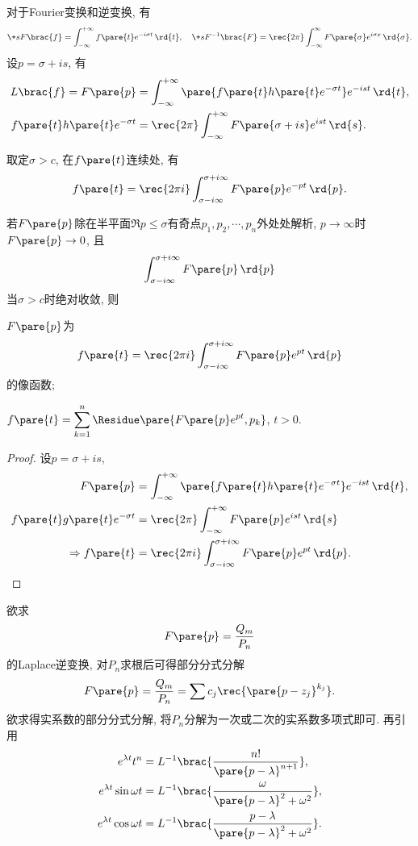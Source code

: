 \documentclass[../ComplexVariable.tex]{subfiles}
\begin{document}
对于Fourier变换和逆变换, 有
\[ \+sF\brac{f} = \int_{-\infty}^{+\infty} f\pare{t}e^{-i\sigma t}\,\rd{t},\quad \+sF^{-1}\brac{F} = \rec{2\pi} \int_{-\infty}^{\infty} F\pare{\sigma} e^{i\sigma x}\,\rd{\sigma}. \]
设$p=\sigma + is$, 有
\begin{align*}
    L\brac{f} = F\pare{p} &= \int_{-\infty}^{+\infty} \pare{f\pare{t}h\pare{t}e^{-\sigma t}}e^{-ist}\,\rd{t}, \\
    f\pare{t}h\pare{t}e^{-\sigma t} &= \rec{2\pi} \int_{-\infty}^{+\infty} F\pare{\sigma + is}e^{ist}\,\rd{s}.
\end{align*}
\begin{theorem}
    取定$\sigma > c$, 在$f\pare{t}$连续处, 有
    \[ f\pare{t} = \rec{2\pi i}\int_{\sigma - i\infty}^{\sigma + i\infty}F\pare{p} e^{-pt}\,\rd{p}. \]
\end{theorem}
\begin{theorem}
    若$F\pare{p}$除在半平面$\Re p\le \sigma$有奇点$p_1,p_2,\cdots,p_n$外处处解析, $p\rightarrow\infty$时$F\pare{p}\rightarrow 0$, 且
    \[ \int_{\sigma-i\infty}^{\sigma+i\infty} F\pare{p}\,\rd{p} \]
    当$\sigma > c$时绝对收敛, 则
    \begin{cenum}
        \item $F\pare{p}$为
        \[ f\pare{t} = \rec{2\pi i}\int_{\sigma-i\infty}^{\sigma+i\infty} F\pare{p}e^{pt}\,\rd{p} \]
        的像函数;
        \item $\displaystyle f\pare{t} = \sum_{k=1}^n \Residue\pare{F\pare{p}e^{pt},p_k}$, $t>0$.
    \end{cenum}
\end{theorem}
\begin{proof}
    设$p=\sigma+is$,
    \begin{align*}
        F\pare{p} &= \int_{-\infty}^{+\infty} \pare{f\pare{t}h\pare{t}e^{-\sigma t}} e^{-ist}\,\rd{t}, \\
        f\pare{t}g\pare{t}e^{-\sigma t} &= \rec{2\pi}\int_{-\infty}^{+\infty}F\pare{p}e^{ist}\,\rd{s} \\
        \Rightarrow f\pare{t} &= \rec{2\pi i} \int_{\sigma-i\infty}^{\sigma+i\infty} F\pare{p}e^{pt}\,\rd{p}. \qedhere
    \end{align*}
\end{proof}
欲求
\[ F\pare{p} = \frac{Q_m}{P_n} \]
的Laplace逆变换, 对$P_n$求根后可得部分分式分解
\[ F\pare{p} = \frac{Q_m}{P_n} = \sum c_j \rec{\pare{p-z_j}^{k_j}}. \]
欲求得实系数的部分分式分解, 将$P_n$分解为一次或二次的实系数多项式即可. 再引用
\begin{align*}
            {e^{\lambda t}t^n} &= L^{-1}\brac{\frac{n!}{\pare{p-\lambda}^{n+1}}}, \\
            {e^{\lambda t}\sin \omega t} &= L^{-1}\brac{\frac{\omega}{\pare{p-\lambda}^2 + \omega^2}}, \\
            {e^{\lambda t}\cos \omega t} &= L^{-1}\brac{\frac{p-\lambda}{\pare{p-\lambda}^2 + \omega^2}}.
\end{align*}
\end{document}
